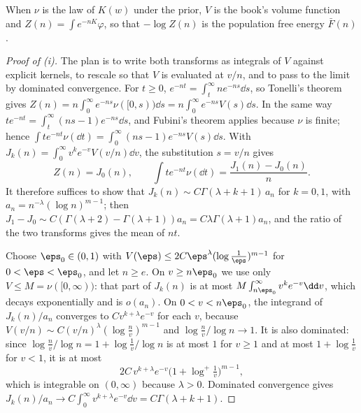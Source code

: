 \begin{refsection}
When $\nu$ is the law of $K(w)$ under the prior, $V$ is the book's volume function and $Z(n)=\int e^{-nK}\varphi$, so that $-\log Z(n)$ is the population free energy $\bar F(n)$.

\begin{proof}[Proof of (i)]
The plan is to write both transforms as integrals of $V$ against explicit kernels, to rescale so that $V$ is evaluated at $v/n$, and to pass to the limit by dominated convergence. For $t\ge0$, $e^{-nt}=\int_t^\infty ne^{-ns}\dd s$, so Tonelli's theorem gives $Z(n)=n\int_0^\infty e^{-ns}\nu([0,s))\dd s=n\int_0^\infty e^{-ns}V(s)\dd s$. In the same way $te^{-nt}=\int_t^\infty(ns-1)e^{-ns}\dd s$, and Fubini's theorem applies because $\nu$ is finite; hence $\int te^{-nt}\nu(\dd t)=\int_0^\infty(ns-1)e^{-ns}V(s)\dd s$. With $J_k(n)=\int_0^\infty v^ke^{-v}V(v/n)\dd v$, the substitution $s=v/n$ gives
\[
Z(n)=J_0(n),\qquad\int te^{-nt}\nu(\dd t)=\frac{J_1(n)-J_0(n)}n.
\]
It therefore suffices to show that $J_k(n)\sim C\Gamma(\lambda+k+1)\,a_n$ for $k=0,1$, with $a_n=n^{-\lambda}(\log n)^{m-1}$; then $J_1-J_0\sim C(\Gamma(\lambda+2)-\Gamma(\lambda+1))a_n=C\lambda\Gamma(\lambda+1)a_n$, and the ratio of the two transforms gives the mean of $nt$.

Choose $\eps_0\in(0,1)$ with $V(\eps)\le2C\eps^\lambda(\log\frac1\eps)^{m-1}$ for $0<\eps<\eps_0$, and let $n\ge e$. On $v\ge n\eps_0$ we use only $V\le M=\nu([0,\infty))$: that part of $J_k(n)$ is at most $M\int_{n\eps_0}^\infty v^ke^{-v}\dd v$, which decays exponentially and is $o(a_n)$. On $0<v<n\eps_0$, the integrand of $J_k(n)/a_n$ converges to $Cv^{k+\lambda}e^{-v}$ for each $v$, because $V(v/n)\sim C(v/n)^\lambda(\log\frac nv)^{m-1}$ and $\log\frac nv/\log n\to1$. It is also dominated: since $\log\frac nv/\log n=1+\log\frac1v/\log n$ is at most $1$ for $v\ge1$ and at most $1+\log\frac1v$ for $v<1$, it is at most
\[
2C\,v^{k+\lambda}e^{-v}\bigl(1+\log^+\tfrac1v\bigr)^{m-1},
\]
which is integrable on $(0,\infty)$ because $\lambda>0$. Dominated convergence gives $J_k(n)/a_n\to C\int_0^\infty v^{k+\lambda}e^{-v}\dd v=C\Gamma(\lambda+k+1)$.
\end{proof}


\end{refsection}
